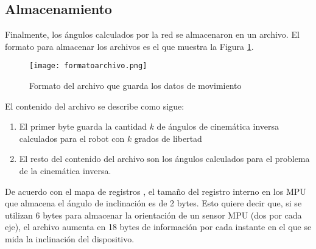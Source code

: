 \newpage
\subsection{Almacenamiento}

Finalmente, los ángulos calculados por la red se almacenaron en un archivo. El formato para almacenar los archivos es el que muestra la Figura \ref{fig:formatoarchivo}.

\begin{figure}[htb]
	\centering
	\texttt{[image: formatoarchivo.png]}
	\caption{Formato del archivo que guarda los datos de movimiento}
	\label{fig:formatoarchivo}
\end{figure}

El contenido del archivo se describe como sigue:

\begin{enumerate}
	\item El primer byte guarda la cantidad $k$ de ángulos de cinemática inversa calculados para el robot con $k$ grados de libertad
	\item El resto del contenido del archivo son los ángulos calculados para el problema de la cinemática inversa.
\end{enumerate}

De acuerdo con el mapa de registros \cite{registermap}, el tamaño del registro interno en los MPU que almacena el ángulo de inclinación es de 2 bytes. Esto quiere decir que, si se utilizan 6 bytes para almacenar la orientación de un sensor MPU (dos por cada eje), el archivo aumenta en 18 bytes de información por cada instante en el que se mida la inclinación del dispositivo.